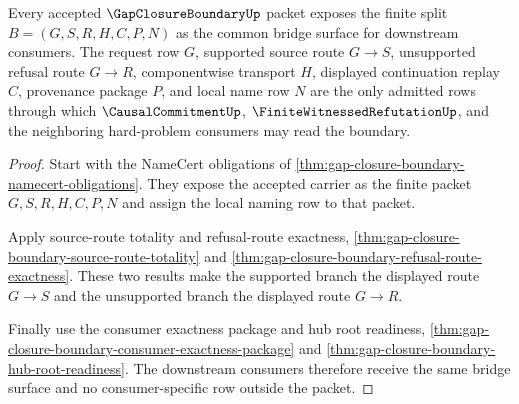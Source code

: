 \begin{theorem}
\label{thm:gap-closure-boundary-consumer-bridge-admission}
Every accepted $\GapClosureBoundaryUp$ packet exposes the finite split $B=(G,S,R,H,C,P,N)$ as the common bridge surface for downstream consumers. The request row $G$, supported source route $G \longrightarrow S$, unsupported refusal route $G \longrightarrow R$, componentwise transport $H$, displayed continuation replay $C$, provenance package $P$, and local name row $N$ are the only admitted rows through which $\CausalCommitmentUp$, $\FiniteWitnessedRefutationUp$, and the neighboring hard-problem consumers may read the boundary.
\end{theorem}
\begin{proof}
Start with the NameCert obligations of \autoref{thm:gap-closure-boundary-namecert-obligations}. They expose the accepted carrier as the finite packet $G,S,R,H,C,P,N$ and assign the local naming row to that packet.

Apply source-route totality and refusal-route exactness, \autoref{thm:gap-closure-boundary-source-route-totality} and \autoref{thm:gap-closure-boundary-refusal-route-exactness}. These two results make the supported branch the displayed route $G \longrightarrow S$ and the unsupported branch the displayed route $G \longrightarrow R$.

Finally use the consumer exactness package and hub root readiness, \autoref{thm:gap-closure-boundary-consumer-exactness-package} and \autoref{thm:gap-closure-boundary-hub-root-readiness}. The downstream consumers therefore receive the same bridge surface and no consumer-specific row outside the packet.
\end{proof}

